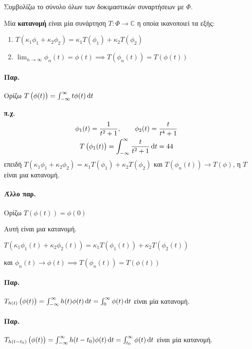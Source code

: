 \documentclass[11pt,a4paper,titlepage,draft]{article}
\begin{document}
Συμβολίζω το σύνολο όλων των δοκιμαστικών συναρτήσεων με \( \Phi \).

\begin{defn}{}{}
Μία \textbf{κατανομή} είναι μία συνάρτηση \( T: \Phi \to \mathbb C \) η οποία ικανοποιεί τα εξής:
\begin{enumerate}
\item \( T(\kappa_1\phi_1 + \kappa_2\phi_2) = \kappa_1T(\phi_1) + \kappa_2T(\phi_2) \)
\item \( \lim_{n\to \infty} \phi_n(t) = \phi(t) \implies T\left(\phi_n(t) \right) = T \left( \phi(t) \right) \)
\end{enumerate}
\end{defn}

\paragraph{Παρ.}
Ορίζω \(T\left(\phi(t)\right) = \int_{-\infty}^\infty t\phi(t) \dif t \)

\textbf{π.χ.}
\begin{gather*}
\phi_1(t) = \frac{1}{t^2+1},\qquad \phi_2(t) = \frac{t}{t^4+1} \\
T\left( \phi_1(t) \right) = \int_{-\infty}^\infty \frac{t}{t^2+1} \dif t = 44
\end{gather*}
επειδή \( T(\kappa_1 \phi_1 + \kappa_2\phi_2) = \kappa_1T(\phi_1)+\kappa_2T(\phi_2)  \) και \( T\left(\phi_n(t) \right) \to T(\phi) \), η \( T \) είναι μια κατανομή.

\paragraph{Άλλο παρ.}
Ορίζω \( T\left(\phi(t) \right) = \phi(0) \)

Αυτή είναι μια κατανομή.

\( T\left(\kappa_1 \phi_1(t) + \kappa_2\phi_2(t)\right) = \kappa_1T\left(\phi_1(t)\right) + \kappa_2 T\left(\phi_2(t)\right)\)

και \( \phi_n(t) \to \phi(t) \implies T\left(\phi_n(t) \right) = T\left(\phi(t) \right) \)

\paragraph{Παρ.}
\( T_{h(t)}\left(\phi(t) \right) = \int_{-\infty}^\infty h(t)\phi(t)\dif t = \int_0^\infty \phi(t)\dif t \) είναι μία κατανομή.

\paragraph{Παρ.}
\( T_{h(t-t_0)}\left(\phi(t) \right) = \int_{-\infty}^\infty h(t-t_0)\phi(t)\dif t = \int_{t_0}^\infty \phi(t)\dif t\) είναι μία κατανομή.
\end{document}
